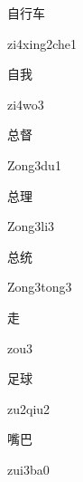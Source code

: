 \begin{multicols*}{2}
\begin{verbete}{自行车}
\begin{pronuncia}{zi4xing2che1}
\end{pronuncia}
\end{verbete}

\begin{verbete}[zi4wo3]{自我}
\begin{pronuncia}{zi4wo3}
\end{pronuncia}
\end{verbete}

\begin{verbete}[Zong3du1]{总督}
\begin{pronuncia}{Zong3du1}
\end{pronuncia}
\end{verbete}

\begin{verbete}[Zong3li3]{总理}
\begin{pronuncia}{Zong3li3}
\end{pronuncia}
\end{verbete}

\begin{verbete}{总统}
\begin{pronuncia}{Zong3tong3}
\end{pronuncia}
\end{verbete}

\begin{verbete}[zou3]{走}
\begin{pronuncia}{zou3}
\end{pronuncia}
\end{verbete}

\begin{verbete}[zu2qiu2]{足球}
\begin{pronuncia}{zu2qiu2}
\end{pronuncia}
\end{verbete}

\begin{verbete}[zui3ba0]{嘴巴}
\begin{pronuncia}{zui3ba0}
\end{pronuncia}
\end{verbete}


\end{multicols*}
